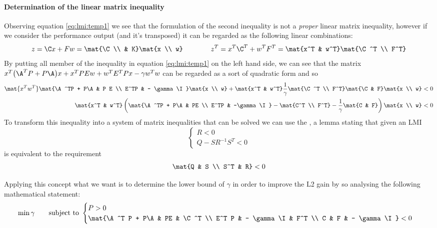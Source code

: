 	\paragraph{Determination of the linear matrix inequality} Observing equation \ref{eq:lmi:temp1} we see that the formulation of the second inequality is not a \textit{proper} linear matrix inequality, however if we consider the performance output (and it's transposed) it can be regarded as the following linear combinations:
	\[ z = \C x + F w = \mat{\C \\ & K} \mat{x \\ w} \hspace{1.4cm} z^T = x^T\C^T + w^T F^T = \mat{x^T & w^T} \mat{\C^T \\ F^T} \]
	By putting all member of the inequality in equation \ref{eq:lmi:temp1} on the left hand side, we can see that the matrix $x^T\big(\A^T P + P \A\big) x + x^T P E w + w^T E^T P x - \gamma w^Tw$ can be regarded as a sort of quadratic form and so
	\begin{align*}
		\mat{x^T w^T} \mat{\A^TP + P\A & P E \\ E^TP & - \gamma \I } \mat{x \\ w} +  \mat{x^T & w^T} \frac 1 \gamma \mat{\C^T \\ F^T} \mat{\C & F} \mat{x \\ w} &  < 0  \\
		\mat{x^T & w^T} \left( \mat{\A^TP + P\A & PE \\ E^TP & -\gamma \I} - \mat{C^T \\ F^T} -\frac 1 \gamma \mat{C & F} \right) \mat{x \\ w}  & < 0
	\end{align*}	
	To transform this inequality into a system of matrix inequalities that can be solved we can use the , a lemma stating that given an LMI
	\[ \begin{cases}
		R < 0 \\ Q - S R^{-1} S^T < 0
	\end{cases} \]
	is equivalent to the requirement
	\begin{equation}
		\mat{Q & S \\ S^T & R} < 0
	\end{equation}

	Applying this concept what we want is to determine the lower bound of $\gamma$ in order to improve the L2 gain by so analysing the following mathematical statement:
	\begin{equation} \min \gamma \qquad \textrm{subject to }
	\begin{cases}
		P > 0 \\
		\mat{\A^T P + P\A & PE & \C^T \\ E^T P & - \gamma \I & F^T \\ C & F & - \gamma \I } < 0
	\end{cases}
	\end{equation}

